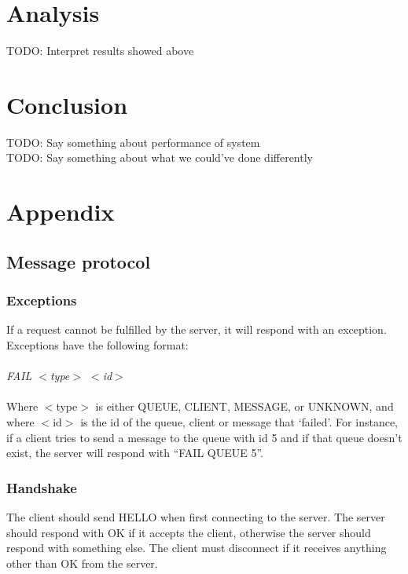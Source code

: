 \documentclass{article}
\begin{document}
    \section{Analysis}
        TODO: Interpret results showed above

    \section{Conclusion}
        TODO: Say something about performance of system\\
        TODO: Say something about what we could've done differently
    \section{Appendix}
        \subsection{Message protocol}
            \subsubsection{Exceptions}
                If a request cannot be fulfilled by the server, it will respond with an exception.  Exceptions have the following format:\\
                \\
                \indent\textit{FAIL $<$type$>$ $<$id$>$}\\
                \\
                Where $<$type$>$ is either QUEUE, CLIENT, MESSAGE, or UNKNOWN, and where $<$id$>$ is the id of the queue, client or message that ‘failed’. For instance, if a client tries to send a message to the queue with id 5 and if that queue doesn’t exist, the server will respond with “FAIL QUEUE 5”.

            \subsubsection{Handshake}
                The client should send HELLO when first connecting to the server. The server should respond with OK if it accepts the client, otherwise the server should respond with something else. The client must disconnect if it receives anything other than OK from the server.
\end{document}
